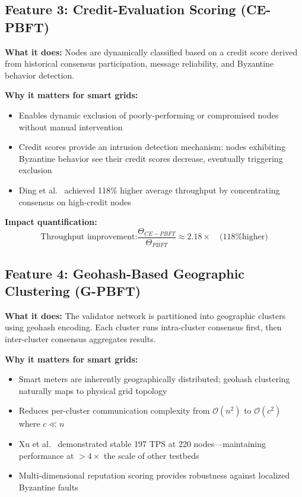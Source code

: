 \documentclass[10pt,twocolumn,letterpaper]{article}
\begin{document}
\subsection{Feature 3: Credit-Evaluation Scoring (CE-PBFT)}

\textbf{What it does:} Nodes are dynamically classified based on a credit score derived from historical consensus participation, message reliability, and Byzantine behavior detection.

\textbf{Why it matters for smart grids:}
\begin{itemize}[leftmargin=*]
    \item Enables dynamic exclusion of poorly-performing or compromised nodes without manual intervention
    \item Credit scores provide an intrusion detection mechanism: nodes exhibiting Byzantine behavior see their credit scores decrease, eventually triggering exclusion
    \item Ding et al.~\cite{ding2024} achieved 118\% higher average throughput by concentrating consensus on high-credit nodes
\end{itemize}

\textbf{Impact quantification:}
\begin{equation}
\text{Throughput improvement:} \frac{\Theta_{CE-PBFT}}{\Theta_{PBFT}} \approx 2.18\times \quad \text{(118\% higher)}
\end{equation}

\subsection{Feature 4: Geohash-Based Geographic Clustering (G-PBFT)}

\textbf{What it does:} The validator network is partitioned into geographic clusters using geohash encoding. Each cluster runs intra-cluster consensus first, then inter-cluster consensus aggregates results.

\textbf{Why it matters for smart grids:}
\begin{itemize}[leftmargin=*]
    \item Smart meters are inherently geographically distributed; geohash clustering naturally maps to physical grid topology
    \item Reduces per-cluster communication complexity from $\mathcal{O}(n^2)$ to $\mathcal{O}(c^2)$ where $c \ll n$
    \item Xu et al.~\cite{xu2025} demonstrated stable 197 TPS at 220 nodes---maintaining performance at $>4\times$ the scale of other testbeds
    \item Multi-dimensional reputation scoring provides robustness against localized Byzantine faults
\end{itemize}
\end{document}
